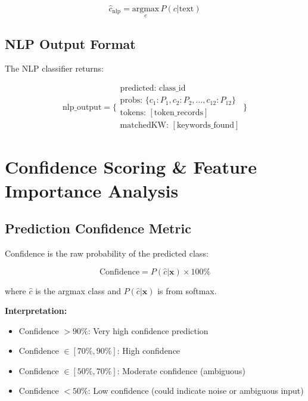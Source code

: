 \documentclass[10pt]{article}
\begin{document}
\begin{equation}
\hat{c}_{\text{nlp}} = \underset{c}{\text{argmax}} \, P(c|\text{text})
\end{equation}

\subsection{NLP Output Format}

The NLP classifier returns:

\begin{equation}
\text{nlp\_output} = \{
\begin{array}{l}
\text{predicted: class\_id} \\
\text{probs: } \{c_1: P_1, c_2: P_2, \ldots, c_{12}: P_{12}\} \\
\text{tokens: } [\text{token\_records}] \\
\text{matchedKW: } [\text{keywords\_found}]
\end{array}
\}
\end{equation}


\section{Confidence Scoring \& Feature Importance Analysis}

\subsection{Prediction Confidence Metric}

Confidence is the raw probability of the predicted class:

\begin{equation}
\text{Confidence} = P(\hat{c}|\mathbf{x}) \times 100\%
\end{equation}

where $\hat{c}$ is the argmax class and $P(\hat{c}|\mathbf{x})$ is from softmax.

\textbf{Interpretation:}
\begin{itemize}
    \item Confidence $> 90\%$: Very high confidence prediction
    \item Confidence $\in [70\%, 90\%]$: High confidence
    \item Confidence $\in [50\%, 70\%]$: Moderate confidence (ambiguous)
    \item Confidence $< 50\%$: Low confidence (could indicate noise or ambiguous input)
\end{itemize}
\end{document}
